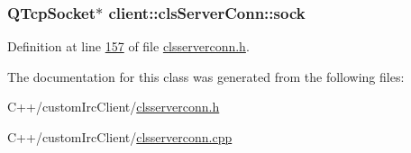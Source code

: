 \hypertarget{classclient_1_1cls_server_conn_a482564a7684e6ba545efb80cd1b5f20b}{
\subsubsection[{sock}]{\setlength{\rightskip}{0pt plus 5cm}Q\-Tcp\-Socket$\ast$ client\-::cls\-Server\-Conn\-::sock\hspace{0.3cm}{\ttfamily [private]}}}\label{d3/d65/classclient_1_1cls_server_conn_a482564a7684e6ba545efb80cd1b5f20b}


Definition at line \hyperlink{clsserverconn_8h_source_l00157}{157} of file \hyperlink{clsserverconn_8h_source}{clsserverconn.\-h}.



The documentation for this class was generated from the following files\-:\begin{DoxyCompactItemize}
\item 
C++/custom\-Irc\-Client/\hyperlink{clsserverconn_8h}{clsserverconn.\-h}\item 
C++/custom\-Irc\-Client/\hyperlink{clsserverconn_8cpp}{clsserverconn.\-cpp}\end{DoxyCompactItemize}
